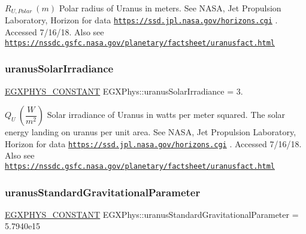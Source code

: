 $R_{U,Polar} \ (m)$ Polar radius of Uranus in meters. See N\+A\+SA, Jet Propulsion Laboratory, Horizon for data \href{https://ssd.jpl.nasa.gov/horizons.cgi}{\tt https\+://ssd.\+jpl.\+nasa.\+gov/horizons.\+cgi} . Accessed 7/16/18. Also see \href{https://nssdc.gsfc.nasa.gov/planetary/factsheet/uranusfact.html}{\tt https\+://nssdc.\+gsfc.\+nasa.\+gov/planetary/factsheet/uranusfact.\+html} \mbox{\label{group___e_g_x_phys-_constants-_astrophysics-_solar_system-_uranus-_bulk_gab404609141c0f15c982dd80012e9dbcd}} 
\subsubsection{\texorpdfstring{uranus\+Solar\+Irradiance}{uranusSolarIrradiance}}
{\footnotesize\ttfamily \mbox{\hyperlink{group___e_g_x_phys-_constants-_macros_ga76980d288494ce1714c9ac68a95ba702}{E\+G\+X\+P\+H\+Y\+S\+\_\+\+C\+O\+N\+S\+T\+A\+NT}} E\+G\+X\+Phys\+::uranus\+Solar\+Irradiance = 3.}

$ Q_{U} \ (\dfrac{W}{m^2})$ Solar irradiance of Uranus in watts per meter squared. The solar energy landing on uranus per unit area. See N\+A\+SA, Jet Propulsion Laboratory, Horizon for data \href{https://ssd.jpl.nasa.gov/horizons.cgi}{\tt https\+://ssd.\+jpl.\+nasa.\+gov/horizons.\+cgi} . Accessed 7/16/18. Also see \href{https://nssdc.gsfc.nasa.gov/planetary/factsheet/uranusfact.html}{\tt https\+://nssdc.\+gsfc.\+nasa.\+gov/planetary/factsheet/uranusfact.\+html} \mbox{\label{group___e_g_x_phys-_constants-_astrophysics-_solar_system-_uranus-_bulk_ga2638d351b4c8647d718febed6c4d6aa3}} 
\subsubsection{\texorpdfstring{uranus\+Standard\+Gravitational\+Parameter}{uranusStandardGravitationalParameter}}
{\footnotesize\ttfamily \mbox{\hyperlink{group___e_g_x_phys-_constants-_macros_ga76980d288494ce1714c9ac68a95ba702}{E\+G\+X\+P\+H\+Y\+S\+\_\+\+C\+O\+N\+S\+T\+A\+NT}} E\+G\+X\+Phys\+::uranus\+Standard\+Gravitational\+Parameter = 5.\+7940e15}


